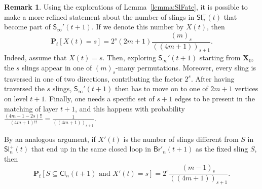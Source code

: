 \documentclass[a4paper,11pt,reqno]{amsart}
\newcommand{\paul}[1]{\todo[color=yellow!70,inline]{Paul: #1}}
\newcommand{\bP}{\mathbf{P}}
\newcommand{\Br}{\mathsf{Br}}
\newcommand{\Slr}{\mathsf{Sl}^+}
\newcommand{\Soo}{\mathsf{S}_\infty}
\newcommand{\Cl}{\mathsf{Cl}}
\newcommand{\fdf}[1]{(\!(#1)\!)}
\newcommand{\ssq}{\subseteq}
\theoremstyle{definition}
\newtheorem{remark}[lemma]{Remark}
\begin{document}
\begin{remark}\label{rem:X}
 Using the explorations of Lemma~\ref{lemma:SlFate}, it is possible to make a more refined statement about the number of slings in $\Slr_n(t)$ that become part of $\Soo'(t+1)$. If we denote this number by $X(t)$, then 
 \[
  \bP_t[X(t)=s]=2^s(2m+1)\frac{(m)_s}{\fdf{4m+1}_{s+1}}.
 \]
 Indeed, assume that $X(t)=s$. Then, exploring $\Soo'(t+1)$ starting from $\mathbf{X}_0$, the $s$ slings appear in one of $(m)_s$-many permutations. Moreover, every sling is traversed in one of two directions, contributing the factor $2^s$. After having traversed the $s$ slings, $\Soo'(t+1)$ then has to move on to one of $2m+1$ vertices on level $t+1$. Finally, one needs a specific set of $s+1$ edges to be present in the matching of layer $t+1$, and this happens with probability $\frac{(4m-1-2s)!!}{(4m+1)!!}=\frac{1}{\fdf{4m+1}_{s+1}}$. 
 
 By an analogous argument, if $X'(t)$ is the number of slings different from $S$ in $\Slr_n(t)$ that end up in the same closed loop in $\Br'_n(t+1)$ as the fixed sling $S$, then 
 \[
  \bP_t[S\ssq\Cl_n(t+1)\text{ and }X'(t)=s]=2^s \frac{(m-1)_s}{\fdf{4m+1}_{s+1}}.
 \]
 
\end{remark}

\end{document}
